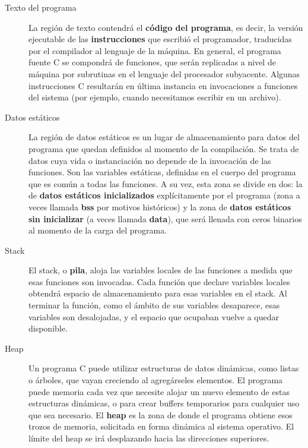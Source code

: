 \begin{description}
	\item[Texto del programa] La región de texto contendrá el \textbf{código del programa}, es decir, la versión ejecutable de las
\textbf{instrucciones} que escribió el programador, traducidas por el compilador al lenguaje de la máquina. En
general, el programa fuente C se compondrá de funciones, que serán replicadas a nivel de máquina por
subrutinas en el lenguaje del procesador subyacente. Algunas instrucciones C resultarán en última
instancia en invocaciones a funciones del sistema (por ejemplo, cuando necesitamos escribir en un
archivo).
	\item[Datos estáticos] La región de datos estáticos es un lugar de almacenamiento para datos del programa que quedan
definidos al momento de la compilación. Se trata de datos cuya vida o instanciación no depende de la
invocación de las funciones. Son las variables estáticas, definidas en el cuerpo del programa que es
común a todas las funciones. A su vez, esta zona se divide en dos: la de \textbf{datos estáticos inicializados}
explícitamente por el programa (zona a veces llamada \textbf{bss} por motivos históricos) y la zona de \textbf{datos
estáticos sin inicializar} (a veces llamada \textbf{data}), que será llenada con ceros binarios al momento de la
carga del programa.
	\item[Stack] El stack, o \textbf{pila}, aloja las variables locales de las funciones a medida que esas funciones son invocadas. Cada función que declare variables locales obtendrá espacio de almacenamiento para esas variables en el stack. Al terminar la función, como el ámbito de sus variables desaparece, esas variables son desalojadas, y el espacio que ocupaban vuelve a quedar disponible. 
	\item[Heap] Un programa C puede utilizar estructuras de datos dinámicas, como listas o árboles, que vayan
creciendo al agregárseles elementos. El programa puede  memoria cada vez que necesite alojar
un nuevo elemento de estas estructuras dinámicas, o para crear buffers temporarios para cualquier uso
que sea necesario. El \textbf{heap} es la zona de donde el programa obtiene esos trozos de memoria, solicitada en forma dinámica al sistema operativo. El límite del heap se irá desplazando hacia las direcciones superiores.

\end{description}

